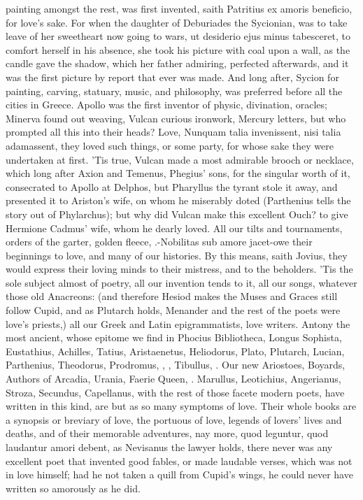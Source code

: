 painting amongst the rest, was first invented, saith Patritius ex
amoris beneficio, for love's sake. For when the daughter of
Deburiades the Sycionian, was to take leave of her sweetheart now
going to wars, ut desiderio ejus minus tabesceret, to comfort herself
in his absence, she took his picture with coal upon a wall, as the
candle gave the shadow, which her father admiring, perfected
afterwards, and it was the first picture by report that ever was made.
And long after, Sycion for painting, carving, statuary, music, and
philosophy, was preferred before all the cities in Greece. Apollo
was the first inventor of physic, divination, oracles; Minerva found
out weaving, Vulcan curious ironwork, Mercury letters, but who prompted
all this into their heads? Love, Nunquam talia invenissent, nisi talia
adamassent, they loved such things, or some party, for whose sake they
were undertaken at first. 'Tis true, Vulcan made a most admirable
brooch or necklace, which long after Axion and Temenus, Phegius' sons,
for the singular worth of it, consecrated to Apollo at Delphos, but
Pharyllus the tyrant stole it away, and presented it to Ariston's wife,
on whom he miserably doted (Parthenius tells the story out of
Phylarchus); but why did Vulcan make this excellent Ouch? to give
Hermione Cadmus' wife, whom he dearly loved. All our tilts and
tournaments, orders of the garter, golden fleece, \etc{}.-Nobilitas sub
amore jacet-owe their beginnings to love, and many of our histories. By
this means, saith Jovius, they would express their loving minds to
their mistress, and to the beholders. 'Tis the sole subject almost of
poetry, all our invention tends to it, all our songs, whatever those
old Anacreons: (and therefore Hesiod makes the Muses and Graces still
follow Cupid, and as Plutarch holds, Menander and the rest of the poets
were love's priests,) all our Greek and Latin epigrammatists, love
writers. Antony \Diogenes the most ancient, whose epitome we find in
Phocius Bibliotheca, Longus Sophista, Eustathius, Achilles, Tatius,
Aristaenetus, Heliodorus, Plato, Plutarch, Lucian, Parthenius,
Theodorus, Prodromus, \Ovid, \Catullus{}, Tibullus, \etc{}. Our new Ariostoes,
Boyards, Authors of Arcadia, Urania, Faerie Queen, \etc{}. Marullus,
Leotichius, Angerianus, Stroza, Secundus, Capellanus, \etc{} with the rest
of those facete modern poets, have written in this kind, are but as so
many symptoms of love. Their whole books are a synopsis or breviary of
love, the portuous of love, legends of lovers' lives and deaths, and of
their memorable adventures, nay more, quod leguntur, quod laudantur
amori debent, as Nevisanus the lawyer holds, there never was any
excellent poet that invented good fables, or made laudable verses,
which was not in love himself; had he not taken a quill from Cupid's
wings, he could never have written so amorously as he did.


